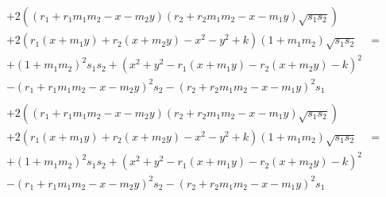 \documentclass{article}
\begin{document}
\begin{align*}
  + 2 ((r_1 + r_1 m_1 m_2 - x - m_2 y) (r_2 + r_2 m_1 m_2 - x - m_1 y) \sqrt{s_1 s_2})\\
  + 2 (r_1 (x + m_1 y) + r_2 (x + m_2 y) - x^2 - y^2 + k) (1 + m_1 m_2) \sqrt{s_1 s_2} &= \\
  + (1 + m_1 m_2)^2 s_1 s_2 + (x^2 + y^2 - r_1 (x + m_1 y) - r_2 (x + m_2 y) - k)^2\\
  - (r_1 + r_1 m_1 m_2 - x - m_2 y)^2 s_2
  - (r_2 + r_2 m_1 m_2 - x - m_1 y)^2 s_1\\
\end{align*}
\begin{align*}
  + 2 ((r_1 + r_1 m_1 m_2 - x - m_2 y) (r_2 + r_2 m_1 m_2 - x - m_1 y) \sqrt{s_1 s_2})\\
  + 2 (r_1 (x + m_1 y) + r_2 (x + m_2 y) - x^2 - y^2 + k) (1 + m_1 m_2) \sqrt{s_1 s_2} &= \\
  + (1 + m_1 m_2)^2 s_1 s_2 + (x^2 + y^2 - r_1 (x + m_1 y) - r_2 (x + m_2 y) - k)^2\\
  - (r_1 + r_1 m_1 m_2 - x - m_2 y)^2 s_2
  - (r_2 + r_2 m_1 m_2 - x - m_1 y)^2 s_1\\
\end{align*}
\end{document}
